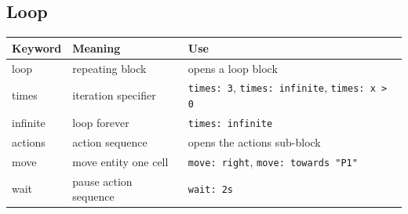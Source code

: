 \documentclass[12pt,a4paper]{article}
\begin{document}
\subsection{Loop}
\begin{longtable}{KMU}
\toprule
\normalfont\textbf{Keyword} & \textbf{Meaning} & \textbf{Use} \\
\midrule
loop     & repeating block       & opens a loop block \\
times    & iteration specifier   & \texttt{times: 3}, \texttt{times: infinite}, \texttt{times: x > 0} \\
infinite & loop forever          & \texttt{times: infinite} \\
actions  & action sequence       & opens the actions sub-block \\
move     & move entity one cell  & \texttt{move: right}, \texttt{move: towards "P1"} \\
wait     & pause action sequence & \texttt{wait: 2s} \\
\bottomrule
\end{longtable}
\end{document}
